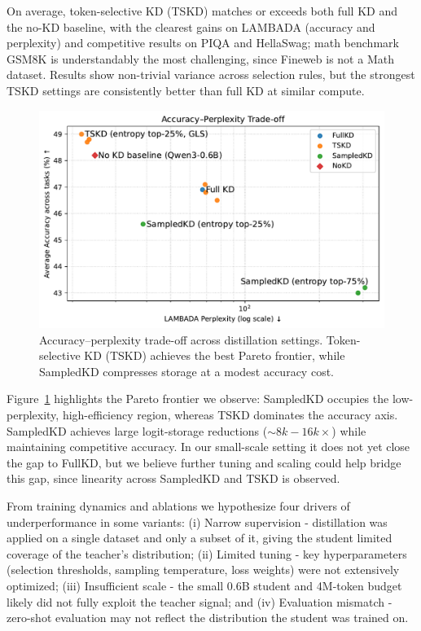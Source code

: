 \documentclass[11pt]{article}
\begin{document}
On average, token-selective KD (TSKD) matches or exceeds both full KD and the no-KD baseline, with the clearest gains on LAMBADA (accuracy and perplexity) and competitive results on PIQA and HellaSwag; math benchmark GSM8K is understandably the most challenging, since Fineweb is not a Math dataset.
Results show non-trivial variance across selection rules, but the strongest TSKD settings are consistently better than full KD at similar compute.

\begin{figure}[t]
\centering
\includegraphics[width=\linewidth]{fig_pareto_acc_vs_ppl.pdf}
\caption{Accuracy--perplexity trade-off across distillation settings. Token-selective KD (TSKD) achieves the best Pareto frontier, while SampledKD compresses storage at a modest accuracy cost.}
\label{fig:acc-ppl}
\end{figure}

Figure~\ref{fig:acc-ppl} highlights the Pareto frontier we observe: SampledKD occupies the low-perplexity, high-efficiency region, whereas TSKD dominates the accuracy axis.
SampledKD achieves large logit-storage reductions ($\sim8k-16k\times$) while maintaining competitive accuracy.
In our small-scale setting it does not yet close the gap to FullKD, but we believe further tuning and scaling could help bridge this gap, since linearity across SampledKD and TSKD is observed.

From training dynamics and ablations we hypothesize four drivers of underperformance in some variants:
(i) Narrow supervision - distillation was applied on a single dataset and only a subset of it, giving the student limited coverage of the teacher's distribution;
(ii) Limited tuning - key hyperparameters (selection thresholds, sampling temperature, loss weights) were not extensively optimized;
(iii) Insufficient scale - the small 0.6B student and 4M-token budget likely did not fully exploit the teacher signal; and
(iv) Evaluation mismatch - zero-shot evaluation may not reflect the distribution the student was trained on.
\end{document}

